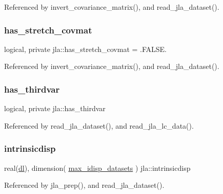 Referenced by invert\+\_\+covariance\+\_\+matrix(), and read\+\_\+jla\+\_\+dataset().

\mbox{\label{namespacejla_a41c379420fdf30a15f9f79533c2e9172}} 
\subsubsection{\texorpdfstring{has\+\_\+stretch\+\_\+covmat}{has\_stretch\_covmat}}
{\footnotesize\ttfamily logical, private jla\+::has\+\_\+stretch\+\_\+covmat = .F\+A\+L\+S\+E.\hspace{0.3cm}{\ttfamily [private]}}



Referenced by invert\+\_\+covariance\+\_\+matrix(), and read\+\_\+jla\+\_\+dataset().

\mbox{\label{namespacejla_a340aa04c1acf8e62ad8fe9261de0ad91}} 
\subsubsection{\texorpdfstring{has\+\_\+thirdvar}{has\_thirdvar}}
{\footnotesize\ttfamily logical, private jla\+::has\+\_\+thirdvar\hspace{0.3cm}{\ttfamily [private]}}



Referenced by read\+\_\+jla\+\_\+dataset(), and read\+\_\+jla\+\_\+lc\+\_\+data().

\mbox{\label{namespacejla_a20678b08d3fa64ee1a64c9ff41d1cdf9}} 
\subsubsection{\texorpdfstring{intrinsicdisp}{intrinsicdisp}}
{\footnotesize\ttfamily real(\mbox{\hyperlink{namespacejla_a3aa6435b4e08f1d532390186ac608741}{dl}}), dimension( \mbox{\hyperlink{namespacejla_a15038ba72bb06d328f2c43f0d0dd5a53}{max\+\_\+idisp\+\_\+datasets}} ) jla\+::intrinsicdisp}



Referenced by jla\+\_\+prep(), and read\+\_\+jla\+\_\+dataset().

